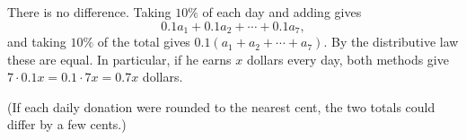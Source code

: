 There is no difference. Taking $10\%$ of each day and adding gives
\[0.1a_1+0.1a_2+\cdots+0.1a_7,\]
and taking $10\%$ of the total gives $0.1\left(a_1+a_2+\cdots+a_7\right)$. By the distributive law these are equal. In particular, if he earns $x$ dollars every day, both methods give $7\cdot0.1x=0.1\cdot7x=0.7x$ dollars.

(If each daily donation were rounded to the nearest cent, the two totals could differ by a few cents.)
